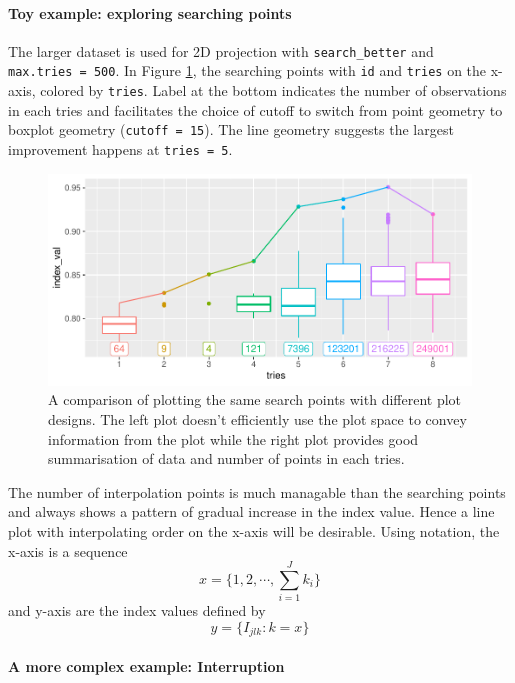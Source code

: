 \documentclass[12pt]{article}
\begin{document}
\hypertarget{toy-example-exploring-searching-points}{%
\paragraph{Toy example: exploring searching
points}\label{toy-example-exploring-searching-points}}

The larger dataset is used for 2D projection with
\texttt{search\_better} and \texttt{max.tries\ =\ 500}. In Figure
\ref{points}, the searching points with \texttt{id} and \texttt{tries}
on the x-axis, colored by \texttt{tries}. Label at the bottom indicates
the number of observations in each tries and facilitates the choice of
cutoff to switch from point geometry to boxplot geometry
(\texttt{cutoff\ =\ 15}). The line geometry suggests the largest
improvement happens at \texttt{tries\ =\ 5}.

\begin{figure}
\centering
\includegraphics{paper_files/figure-latex/points-tries-1.pdf}
\caption{\label{points}A comparison of plotting the same search points
with different plot designs. The left plot doesn't efficiently use the
plot space to convey information from the plot while the right plot
provides good summarisation of data and number of points in each tries.}
\end{figure}

\newpage

The number of interpolation points is much managable than the searching
points and always shows a pattern of gradual increase in the index
value. Hence a line plot with interpolating order on the x-axis will be
desirable. Using notation, the x-axis is a sequence
\[x = \{1, 2, \cdots,\sum_{i=1}^Jk_i\}\] and y-axis are the index values
defined by \[y = \{I_{jlk}: k = x\}\]

\hypertarget{a-more-complex-example-interruption}{%
\paragraph{A more complex example:
Interruption}\label{a-more-complex-example-interruption}}
\end{document}
